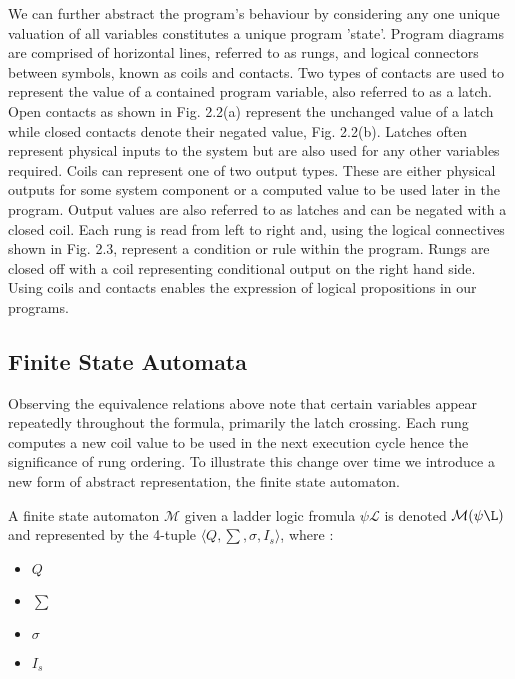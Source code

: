 \documentclass[runningheads]{llncs}
\begin{document}
We can further abstract the program's behaviour by considering any one unique valuation of all variables constitutes a unique program 'state'. Program diagrams are comprised of horizontal lines, referred
to as rungs, and logical connectors between symbols, known as coils and contacts. Two types of contacts are used to represent the value of a contained program variable, also referred to as a latch. Open contacts as shown in Fig. 2.2(a) represent the unchanged value of a latch while closed contacts denote their negated value, Fig. 2.2(b). Latches often represent physical inputs to the system but are also used for any other variables required. Coils can represent one of two output types. These are either physical outputs
for some system component or a computed value to be used later in the program. Output values are also referred to as latches and can be negated with a closed coil. Each rung is read from left to right and, using the logical connectives shown in Fig. 2.3, represent a condition or rule within the program. Rungs are closed off with a coil representing conditional output on the right hand side. Using coils and contacts enables the expression of logical propositions in our programs. 

\subsection{Finite State Automata}
Observing the equivalence relations above note that certain variables appear repeatedly
throughout the formula, primarily the latch crossing. Each rung computes a new coil
value to be used in the next execution cycle hence the significance of rung ordering. To illustrate this change over time we introduce a new form of abstract representation, the finite state automaton.

\begin{definition}
	A finite state automaton $\mathcal{M}$ given a ladder logic fromula $\psi\mathcal{L}$ is denoted $\mathcal{M(\psi\L)}$ and represented by the 4-tuple $\langle Q, \sum, \sigma, I_s \rangle$, where :
	\begin{itemize}
		\item $Q$ 
		\item $\sum$
		\item $\sigma$
		\item $I_s$
	\end{itemize}
\end{definition}
\end{document}
